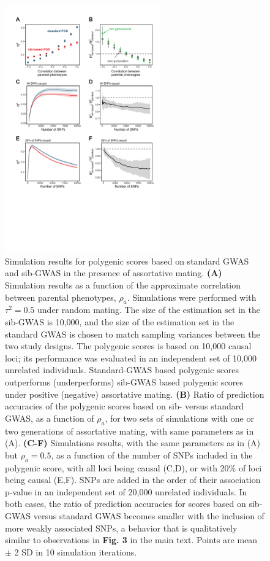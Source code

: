 \documentclass[hidelinks, 12pt]{article}
\begin{document}
\pagebreak

\begin{figure}[h]
\centering
\includegraphics[width=0.6\textwidth]{supp_figures/assort_mate.pdf}
\caption[Simulation results for polygenic scores based on standard GWAS and sib-GWAS in the presence of assortative mating.]{\small Simulation results for polygenic scores based on standard GWAS and sib-GWAS in the presence of assortative mating. {\bf (A)} Simulation results as a function of the approximate correlation between parental phenotypes, $\rho_a$. Simulations were performed with $\tau^2=0.5$ under random mating. The size of the estimation set in the sib-GWAS is 10,000, and the size of the estimation set in the standard GWAS is chosen to match sampling variances between the two study designs. The polygenic scores is based on 10,000 causal loci; its performance was evaluated in an independent set of 10,000 unrelated individuals. Standard-GWAS based polygenic scores outperforms (underperforms) sib-GWAS based polygenic scores under positive (negative) assortative mating. {\bf (B)} Ratio of prediction accuracies of the polygenic scores based on sib- versus standard GWAS, as a function of $\rho_a$, for two sets of simulations with one or two generations of assortative mating, with same parameters as in (A). {\bf (C-F)} Simulations results, with the same parameters as in (A) but $\rho_a=0.5$, as a function of the number of SNPs included in the polygenic score, with all loci being causal (C,D), or with 20\% of loci being causal (E,F). SNPs are added in the order of their association p-value in an independent set of 20,000 unrelated individuals. In both cases, the ratio of prediction accuracies for scores based on sib-GWAS versus standard GWAS becomes smaller with the inclusion of more weakly associated SNPs, a behavior that is qualitatively similar to observations in {\bf Fig. 3} in the main text. Points are mean $\pm$ 2 SD in 10 simulation iterations.} 
\label{fig_assort_mate}
\end{figure}
\end{document}
